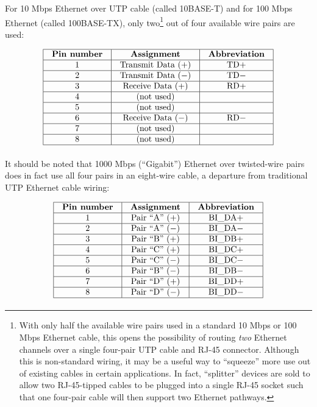 For 10 Mbps Ethernet over UTP cable (called 10BASE-T) and for 100 Mbps Ethernet (called 100BASE-TX), only two\footnote{With only half the available wire pairs used in a standard 10 Mbps or 100 Mbps Ethernet cable, this opens the possibility of routing \textit{two} Ethernet channels over a single four-pair UTP cable and RJ-45 connector.  Although this is non-standard wiring, it may be a useful way to ``squeeze'' more use out of existing cables in certain applications.  In fact, ``splitter'' devices are sold to allow two RJ-45-tipped cables to be plugged into a single RJ-45 socket such that one four-pair cable will then support two Ethernet pathways.} out of four available wire pairs are used:


$$\vbox{\offinterlineskip
\halign{\strut
\vrule \quad\hfil # \ \hfil & 
\vrule \quad\hfil # \ \hfil & 
\vrule \quad\hfil # \ \hfil \vrule \cr
\noalign{\hrule}
%
\textbf{Pin number} & \textbf{Assignment} & \textbf{Abbreviation} \cr
%
\noalign{\hrule}
%
1 & Transmit Data (+) & TD+ \cr
%
\noalign{\hrule}
%
2 & Transmit Data ($-$) & TD$-$ \cr
%
\noalign{\hrule}
%
3 & Receive Data (+) & RD+ \cr
%
\noalign{\hrule}
%
4 & (not used) &  \cr
%
\noalign{\hrule}
%
5 & (not used) &  \cr
%
\noalign{\hrule}
%
6 & Receive Data ($-$) & RD$-$ \cr
%
\noalign{\hrule}
%
7 & (not used) &  \cr
%
\noalign{\hrule}
%
8 & (not used) &  \cr
%
\noalign{\hrule}
} %
}$$ %

It should be noted that 1000 Mbps (``Gigabit'') Ethernet over twisted-wire pairs does in fact use all four pairs in an eight-wire cable, a departure from traditional UTP Ethernet cable wiring:


$$\vbox{\offinterlineskip
\halign{\strut
\vrule \quad\hfil # \ \hfil & 
\vrule \quad\hfil # \ \hfil & 
\vrule \quad\hfil # \ \hfil \vrule \cr
\noalign{\hrule}
%
\textbf{Pin number} & \textbf{Assignment} & \textbf{Abbreviation} \cr
%
\noalign{\hrule}
%
1 & Pair ``A'' (+) & BI\_DA+ \cr
%
\noalign{\hrule}
%
2 & Pair ``A'' ($-$) & BI\_DA$-$ \cr
%
\noalign{\hrule}
%
3 & Pair ``B'' (+) & BI\_DB+ \cr
%
\noalign{\hrule}
%
4 & Pair ``C'' (+) & BI\_DC+ \cr
%
\noalign{\hrule}
%
5 & Pair ``C'' ($-$) & BI\_DC$-$ \cr
%
\noalign{\hrule}
%
6 & Pair ``B'' ($-$) & BI\_DB$-$ \cr
%
\noalign{\hrule}
%
7 & Pair ``D'' (+) & BI\_DD+ \cr
%
\noalign{\hrule}
%
8 & Pair ``D'' ($-$) & BI\_DD$-$ \cr
%
\noalign{\hrule}
} %
}$$ %


